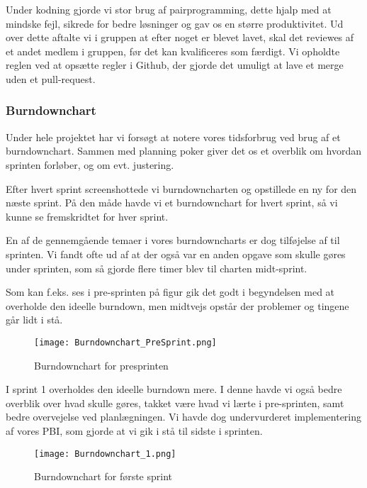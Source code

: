 Under kodning gjorde vi stor brug af pairprogramming, dette hjalp med at mindske fejl, sikrede for bedre løsninger og gav os en større produktivitet.
Ud over dette aftalte vi i gruppen at efter noget er blevet lavet, 
skal det reviewes af et andet medlem i gruppen, før det kan kvalificeres som færdigt. Vi opholdte reglen ved at opsætte regler i Github, der gjorde det umuligt at lave et merge uden et pull-request.

\subsubsection{Burndownchart}

Under hele projektet har vi forsøgt at notere vores tidsforbrug ved brug af et burndownchart. Sammen med planning poker giver det os et overblik om hvordan sprinten forløber, og om evt. justering. 

Efter hvert sprint screenshottede vi burndowncharten og opstillede en ny for den næste sprint. På den måde havde vi et burndownchart for hvert sprint, så vi kunne se fremskridtet for hver sprint.

En af de gennemgående temaer i vores burndowncharts er dog tilføjelse af til sprinten. Vi fandt ofte ud af at der også var en anden opgave som skulle gøres under sprinten, som så gjorde flere timer blev til charten midt-sprint. 

Som kan f.eks. ses i pre-sprinten på figur \label{burndownsprint} gik det godt i begyndelsen med at overholde den ideelle burndown, men midtvejs opstår der problemer og tingene går lidt i stå.

\begin{figure}[h]
    \caption{Burndownchart for presprinten}
    \centering
        \texttt{[image: Burndownchart\_PreSprint.png]}
    \label{burndownpresprint}
\end{figure}

I sprint 1 overholdes den ideelle burndown mere. I denne havde vi også bedre overblik over hvad skulle gøres, takket være hvad vi lærte i pre-sprinten, samt bedre overvejelse ved planlægningen. Vi havde dog undervurderet implementering af vores PBI, som gjorde at vi gik i stå til sidste i sprinten.

\begin{figure}[h]
    \caption{Burndownchart for første sprint}
    \centering
        \texttt{[image: Burndownchart\_1.png]}
    \label{burndownfirstsprint}
\end{figure}



